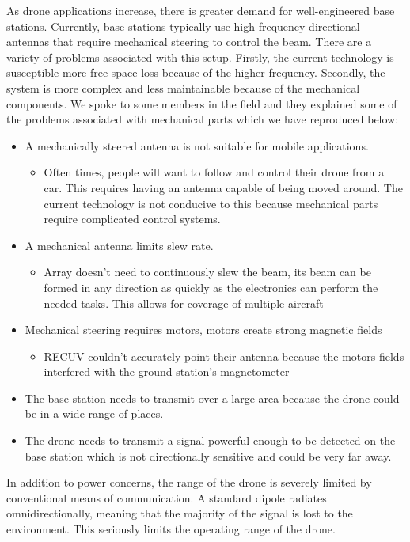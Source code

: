 \documentclass[11pt]{article}
\numberwithin{figure}{section}
\begin{document}
	As drone applications increase, there is greater demand for well-engineered base stations. Currently, base stations typically use high frequency directional antennas that require mechanical steering to control the beam. There are a variety of problems associated with this setup. Firstly, the current technology is susceptible more free space loss because of the higher frequency. Secondly, the system is more complex and less maintainable because of the mechanical components. We spoke to some members in the field and they explained some of the problems associated with mechanical parts which we have reproduced below:
	\begin{itemize}
		\item A mechanically steered antenna is not suitable for mobile applications.
		\begin{itemize}
			\item Often times, people will want to follow and control their drone from a car. This requires having an antenna capable of being moved around. The current technology is not conducive to this because mechanical parts require complicated control systems.
		\end{itemize}
		\item A mechanical antenna limits slew rate.
		\begin{itemize}
			\item Array doesn’t need to continuously slew the beam, its beam can be formed in any direction as quickly as the electronics can perform the needed tasks. This allows for coverage of multiple aircraft
		\end{itemize}
		\item Mechanical steering requires motors, motors create strong magnetic fields
		\begin{itemize}
			\item RECUV couldn’t accurately point their antenna because the motors fields interfered with the ground station’s magnetometer
		\end{itemize}

		\item The base station needs to transmit over a large area because the drone could be in a wide range of places.
		\item The drone needs to transmit a signal powerful enough to be detected on the base station which is not directionally sensitive and could be very far away.
	\end{itemize}

	
	In addition to power concerns, the range of the drone is severely limited by conventional means of communication.  A standard dipole radiates omnidirectionally, meaning that the majority of the signal is lost to the environment.  This seriously limits the operating range of the drone.  \\
	
\end{document}
